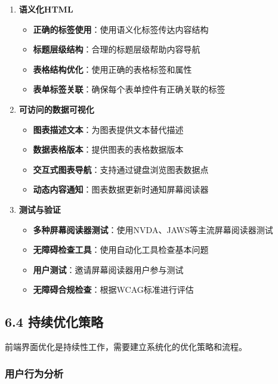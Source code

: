 \begin{enumerate}
\def\labelenumi{\arabic{enumi}.}
\tightlist
\item
  \textbf{语义化HTML}

  \begin{itemize}
  \tightlist
  \item
    \textbf{正确的标签使用}：使用语义化标签传达内容结构
  \item
    \textbf{标题层级结构}：合理的标题层级帮助内容导航
  \item
    \textbf{表格结构优化}：使用正确的表格标签和属性
  \item
    \textbf{表单标签关联}：确保每个表单控件有正确关联的标签
  \end{itemize}
\item
  \textbf{可访问的数据可视化}

  \begin{itemize}
  \tightlist
  \item
    \textbf{图表描述文本}：为图表提供文本替代描述
  \item
    \textbf{数据表格版本}：提供图表的表格数据版本
  \item
    \textbf{交互式图表导航}：支持通过键盘浏览图表数据点
  \item
    \textbf{动态内容通知}：图表数据更新时通知屏幕阅读器
  \end{itemize}
\item
  \textbf{测试与验证}

  \begin{itemize}
  \tightlist
  \item
    \textbf{多种屏幕阅读器测试}：使用NVDA、JAWS等主流屏幕阅读器测试
  \item
    \textbf{无障碍检查工具}：使用自动化工具检查基本问题
  \item
    \textbf{用户测试}：邀请屏幕阅读器用户参与测试
  \item
    \textbf{无障碍合规检查}：根据WCAG标准进行评估
  \end{itemize}
\end{enumerate}

\subsection{6.4
持续优化策略}\label{ux6301ux7eedux4f18ux5316ux7b56ux7565}

前端界面优化是持续性工作，需要建立系统化的优化策略和流程。

\subsubsection{用户行为分析}\label{ux7528ux6237ux884cux4e3aux5206ux6790}

